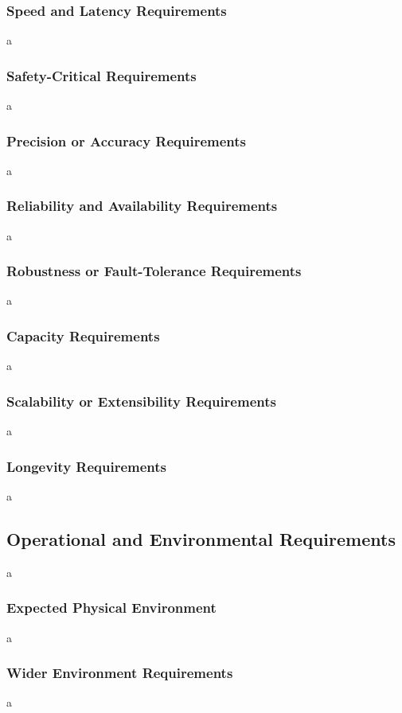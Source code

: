 \documentclass[12pt]{article}
\begin{document}
\subsubsection{Speed and Latency Requirements}
a

\subsubsection{Safety-Critical Requirements}
a

\subsubsection{Precision or Accuracy Requirements}
a

\subsubsection{Reliability and Availability Requirements}
a

\subsubsection{Robustness or Fault-Tolerance Requirements}
a

\subsubsection{Capacity Requirements}
a

\subsubsection{Scalability or Extensibility Requirements}
a

\subsubsection{Longevity Requirements}
a

\subsection{Operational and Environmental Requirements}
a

\subsubsection{Expected Physical Environment}
a

\subsubsection{Wider Environment Requirements}
a
\end{document}
